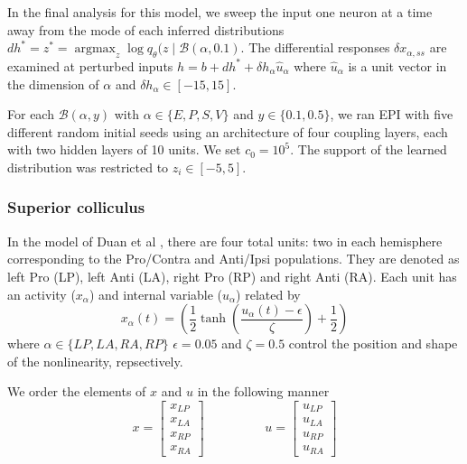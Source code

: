 \documentclass[11pt]{article}
\DeclareMathOperator*{\argmax}{argmax}
\begin{document}
In the final analysis for this model, we sweep the input one neuron at a time away from the mode of each inferred distributions $dh^* = z^* = \argmax_{z} \log q_\theta(z \mid \mathcal{B}(\alpha, 0.1)$.
The differential responses $\delta x_{\alpha,ss}$ are examined at perturbed inputs  $h = b + dh^* + \delta h_\alpha \hat{u}_\alpha$ where $\hat{u}_\alpha$ is a unit vector in the dimension of $\alpha$ and $\delta h_\alpha \in \left[-15,15\right]$.

For each $\mathcal{B}(\alpha, y)$ with $\alpha \in \{E, P, S, V\}$ and $y \in \{0.1, 0.5\}$, we ran EPI with five different random initial seeds using an architecture of four coupling layers, each with two hidden layers of 10 units.  We set $c_0 = 10^5$.  The support of the learned distribution was restricted to $z_i \in \left[-5, 5\right]$.

\subsubsection{Superior colliculus}\label{methods_SC}
In the model of Duan et al \cite{duan2018collicular}, there are four total units: two in each hemisphere corresponding to the Pro/Contra and Anti/Ipsi populations.  They are denoted as left Pro (LP), left Anti (LA), right Pro (RP) and right Anti (RA).  Each unit has an activity ($x_\alpha$) and internal variable ($u_\alpha$) related by
\begin{equation}
x_\alpha(t) =\left(\frac{1}{2}\tanh\left(\frac{u_\alpha(t) - \epsilon}{\zeta}\right)+ \frac{1}{2} \right)
\end{equation}
where $\alpha \in \{LP, LA, RA, RP\}$ $\epsilon = 0.05$ and $\zeta = 0.5$ control the position and shape of the nonlinearity, repsectively.

We order the elements of $x$ and $u$ in the following manner
\begin{equation}
x = \begin{bmatrix} x_{LP} \\ x_{LA} \\ x_{RP} \\ x_{RA} \end{bmatrix} \hspace{2cm} u = \begin{bmatrix} u_{LP} \\ u_{LA} \\ u_{RP} \\ u_{RA} \end{bmatrix}
\end{equation}
\end{document}
